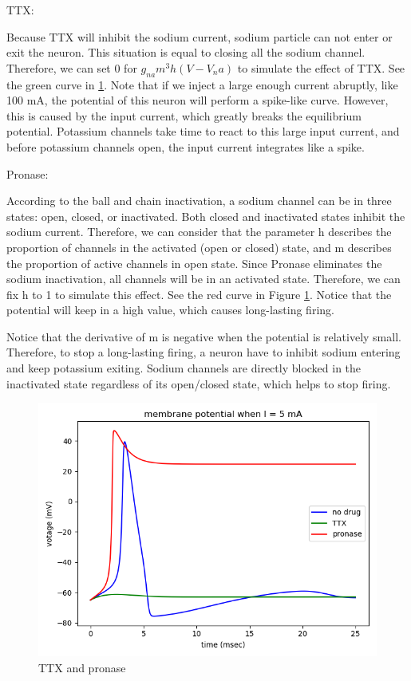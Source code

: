 \documentclass[11pt]{article}
\begin{document}
\begin{enumerate}
		TTX:
		
		Because TTX will inhibit the sodium current, sodium particle can not enter or exit the neuron. This situation is equal to closing all the sodium channel. Therefore, we can set 0 for $g_{na}m^3h(V-V_na)$ to simulate the effect of TTX. See the green curve in \ref{fig:fig5}. Note that if we inject a large enough current abruptly, like 100 mA, the potential of this neuron will perform a spike-like curve. However, this is caused by the input current, which greatly breaks the equilibrium potential. Potassium channels take time to react to this large input current, and before potassium channels open, the input current integrates like a spike.
		
		Pronase:
		
		According to the ball and chain inactivation, a sodium channel can be in three states: open, closed, or inactivated. Both closed and inactivated states inhibit the sodium current. Therefore, we can consider that the parameter h describes the proportion of channels in the activated (open or closed) state, and m describes the proportion of active channels in open state. Since Pronase eliminates the sodium inactivation, all channels will be in an activated state. Therefore, we can fix h to 1 to simulate this effect. See the red curve in Figure \ref{fig:fig5}. Notice that the potential will keep in a high value, which causes long-lasting firing.
		
		Notice that the derivative of m is negative when the potential is relatively small. Therefore, to stop a long-lasting firing, a neuron have to inhibit sodium entering and keep potassium exiting. Sodium channels are directly blocked in the inactivated state regardless of its open/closed state, which helps to stop firing.
		
		\begin{figure}[ht]
			\centering
			\includegraphics[scale=0.3]{plot_programming_7.png}
			\caption{TTX and pronase}
			\label{fig:fig5}
		\end{figure}
	\end{enumerate}
\end{document}
